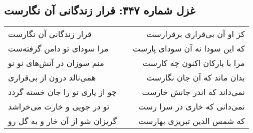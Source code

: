 \begin{center}
\section*{غزل شماره ۳۴۷: قرار زندگانی آن نگارست}
\label{sec:0347}
\begin{longtable}{l p{0.5cm} r}
قرار زندگانی آن نگارست
&&
کز او آن بی‌قراری برقرارست
\\
مرا سودای تو دامن گرفته‌ست
&&
که این سودا نه آن سودای پارست
\\
منم سوزان در آتش‌های نو نو
&&
مرا با یارکان اکنون چه کارست
\\
همی‌نالد درون از بی‌قراری
&&
بدان ماند که آن جان نگارست
\\
چو از یاری تو را جان خسته گردد
&&
نمی‌داند که اندر جانش خارست
\\
تو در جویی و خارت می‌خراشد
&&
نمی‌دانی که خاری در سرا رست
\\
گریزان شو از آن خار و به گل رو
&&
که شمس الدین تبریزی بهارست
\\
\end{longtable}
\end{center}
